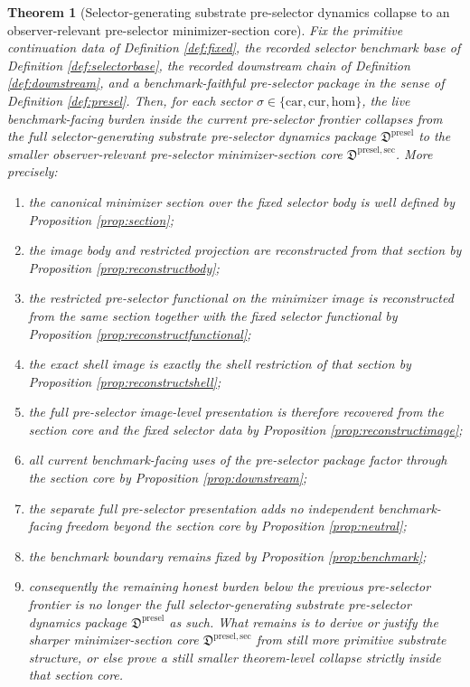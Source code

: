 \documentclass[11pt]{article}
\newcommand{\Car}{\mathrm{car}}
\newcommand{\Cur}{\mathrm{cur}}
\newcommand{\Hom}{\mathrm{hom}}
\newcommand{\PreSelectorPackage}{\mathfrak D^{\mathrm{presel}}}
\newcommand{\PreSelectorMinSectionCore}{\mathfrak D^{\mathrm{presel,sec}}}
\newtheorem{theorem}{Theorem}
\begin{document}
\begin{theorem}[Selector-generating substrate pre-selector dynamics collapse to an observer-relevant pre-selector minimizer-section core]
\label{thm:main}
Fix the primitive continuation data of Definition \ref{def:fixed}, the recorded selector benchmark base of Definition \ref{def:selectorbase}, the recorded downstream chain of Definition \ref{def:downstream}, and a benchmark-faithful pre-selector package in the sense of Definition \ref{def:presel}. Then, for each sector \(\sigma\in\{\Car,\Cur,\Hom\}\), the live benchmark-facing burden inside the current pre-selector frontier collapses from the full selector-generating substrate pre-selector dynamics package \(\PreSelectorPackage\) to the smaller observer-relevant pre-selector minimizer-section core \(\PreSelectorMinSectionCore\). More precisely:
\begin{enumerate}
    \item the canonical minimizer section over the fixed selector body is well defined by Proposition \ref{prop:section};
    \item the image body and restricted projection are reconstructed from that section by Proposition \ref{prop:reconstructbody};
    \item the restricted pre-selector functional on the minimizer image is reconstructed from the same section together with the fixed selector functional by Proposition \ref{prop:reconstructfunctional};
    \item the exact shell image is exactly the shell restriction of that section by Proposition \ref{prop:reconstructshell};
    \item the full pre-selector image-level presentation is therefore recovered from the section core and the fixed selector data by Proposition \ref{prop:reconstructimage};
    \item all current benchmark-facing uses of the pre-selector package factor through the section core by Proposition \ref{prop:downstream};
    \item the separate full pre-selector presentation adds no independent benchmark-facing freedom beyond the section core by Proposition \ref{prop:neutral};
    \item the benchmark boundary remains fixed by Proposition \ref{prop:benchmark};
    \item consequently the remaining honest burden below the previous pre-selector frontier is no longer the full selector-generating substrate pre-selector dynamics package \(\PreSelectorPackage\) as such. What remains is to derive or justify the sharper minimizer-section core \(\PreSelectorMinSectionCore\) from still more primitive substrate structure, or else prove a still smaller theorem-level collapse strictly inside that section core.
\end{enumerate}
\end{theorem}
\end{document}
